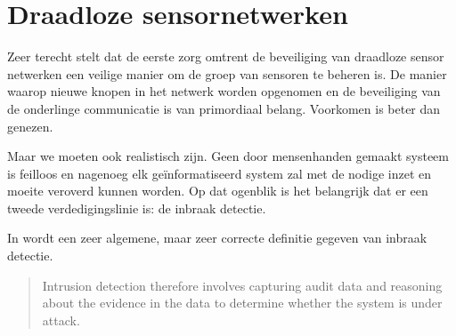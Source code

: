 \section{Draadloze sensornetwerken}
\label{section:landscape}

\TODO

Zeer terecht stelt \cite{perrig2004security} dat de eerste zorg omtrent de
beveiliging van draadloze sensor netwerken een veilige manier om de groep van
sensoren te beheren is. De manier waarop nieuwe knopen in het netwerk worden
opgenomen en de beveiliging van de onderlinge communicatie is van primordiaal
belang. Voorkomen is beter dan genezen.

Maar we moeten ook realistisch zijn. Geen door mensenhanden gemaakt systeem is
feilloos en nagenoeg elk ge\"informatiseerd system zal met de nodige inzet en
moeite veroverd kunnen worden. Op dat ogenblik is het belangrijk dat er een
tweede verdedigingslinie is: de inbraak detectie.

\TODO

In \cite{zhang2000intrusion} wordt een zeer algemene, maar zeer correcte
definitie gegeven van inbraak detectie.

\begin{quote}
Intrusion detection therefore involves capturing audit data and reasoning
about the evidence in the data to determine whether the system is under attack.
\end{quote}
